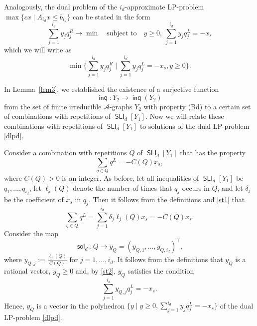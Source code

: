 \documentclass[10pt, reqno]{amsart}
\numberwithin{equation}{section}
\begin{document}
Analogously, the dual problem  of the  $i_d$-approximate LP-problem $\max \{ cx \mid A_{i_d} x \le b_{i_d}  \}$ can be stated in the form
\begin{equation*}
\sum_{j=1}^{i_d } y_j q_j^R \to \min  \quad   \mbox{subject to} \quad  y \ge 0,  \
\sum_{j=1}^{i_d} y_j q_j^L = - x_s
\end{equation*}
which  we will write as
\begin{equation}\label{dlpd}
\min  \{ \sum_{j=1}^{i_d} y_j q_j^R \mid  \sum_{j=1}^{i_d} y_j q_j^L = - x_s , y \ge 0  \} .
\end{equation}

In Lemma~\ref{lem3},  we established the existence of a surjective function
$$
\operatorname{\textsf{inq}}  :   Y_2 \to  \operatorname{\textsf{inq}}(Y_2)
$$
from the set of finite irreducible ${\mathcal{A}}$-graphs $Y_2$ with property (Bd) to a certain set of combinations with  repetitions of $\operatorname{\textsf{SLI}}_d[Y_1]$.
Now we will relate these combinations
with repetitions of $\operatorname{\textsf{SLI}}_d[Y_1]$ to solutions of the dual LP-problem \eqref{dlpd}.

Consider a  combination
 with repetitions $Q$ of $\operatorname{\textsf{SLI}}_d[Y_1]$ that has the property
 \begin{equation}\label{st1}
\sum_{q \in Q} q^L = -C(Q) x_s     ,
\end{equation}
where $C(Q) >0$ is an integer. As before, let all inequalities of $\operatorname{\textsf{SLI}}_d[Y_1]$ be $q_1, \dots, q_{i_{d}}$, let  $\ell_j(Q)$ denote the number of times that $q_j$ occurs in $Q$, and let $\delta_j$ be the coefficient of $x_s$ in $q_j$. Then it follows from the definitions and \eqref{st1} that
\begin{equation}\label{st2}
     \sum_{q \in Q} q^L =  \sum_{j=1 }^{i_d} \delta_j \ell_j(Q) x_s =  -C(Q) x_s    .
\end{equation}
Consider the map
\begin{equation}\label{dfyy}
\operatorname{\textsf{sol}}_d :  Q \to y_Q = ( y_{Q,1}, \dots,  y_{Q, i_{d}} )^{\top}   ,
\end{equation}
where
$y_{Q,j} :=  \tfrac{\ell_j(Q)}{C(Q)}$ for $j =1, \dots, i_{d}$.
It follows from the definitions that $y_Q$ is a rational vector, $y_Q \ge 0$ and, by \eqref{st2}, $y_Q$ satisfies the condition
$$
\sum_{j=1}^{i_{d}} y_{{Q,j}} q_j^L  = - x_s    .
$$
Hence, $y_Q$ is a vector in the polyhedron $\{ y \mid y \ge 0,
\sum_{j=1}^{i_{d}} y_{j} q_j^L   = - x_s \} $ of the dual  LP-problem
\eqref{dlpd}.
\end{document}
